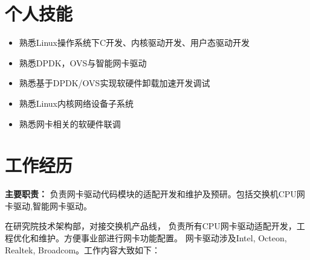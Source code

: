 \documentclass{resume}
\begin{document}
\section{个人技能}
        \begin{itemize}[parsep=0.5ex]
            \item  熟悉Linux操作系统下C开发、内核驱动开发、用户态驱动开发
            \item  熟悉DPDK，OVS与智能网卡驱动
            \item  熟悉基于DPDK/OVS实现软硬件卸载加速开发调试
            \item  熟悉Linux内核网络设备子系统
            \item  熟悉网卡相关的软硬件联调
        \end{itemize}
        \normalsize \par
\sepspace

\section{工作经历}
    \vspace{0.2em}

    \textbf{主要职责：} 
    负责网卡驱动代码模块的适配开发和维护及预研。包括交换机CPU网卡驱动,智能网卡驱动。

    \par


    \hspace{2em}在研究院技术架构部，对接交换机产品线，
    负责所有CPU网卡驱动适配开发，工程优化和维护。方便事业部进行网卡功能配置。
    网卡驱动涉及Intel, Octeon, Realtek, Broadcom。工作内容大致如下：
\end{document}
